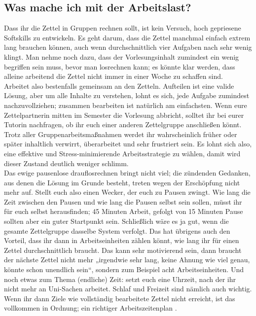 \subsection{Was mache ich mit der Arbeitslast?}
Dass ihr die Zettel in Gruppen rechnen sollt, ist kein Versuch, hoch gepriesene Softskills zu entwickeln. Es geht darum, dass die Zettel manchmal einfach extrem lang brauchen können, auch wenn durchschnittlich vier Aufgaben nach sehr wenig klingt. Man nehme noch dazu, dass der Vorlesungsinhalt zumindest ein wenig begriffen sein muss, bevor man losrechnen kann; es könnte klar werden, dass alleine arbeitend die Zettel nicht immer in einer Woche zu schaffen sind. \\
Arbeitet also bestenfalls gemeinsam an den Zetteln. Aufteilen ist eine valide Lösung, aber um alle Inhalte zu verstehen, lohnt es sich, jede Aufgabe zumindest nachzuvollziehen; zusammen bearbeiten ist natürlich am einfachsten.
Wenn eure Zettelpartnerin mitten im Semester die Vorlesung abbricht, solltet ihr bei eurer Tutorin nachfragen, ob ihr euch einer anderen Zettelgruppe anschließen könnt. \\
Trotz aller Gruppenarbeitsmaßnahmen werdet ihr wahrscheinlich früher oder später inhaltlich verwirrt, überarbeitet und sehr frustriert sein. Es lohnt sich also, eine effektive und Stress-minimierende Arbeitsstrategie zu wählen, damit wird dieser Zustand deutlich weniger schlimm. \\
Das ewige pausenlose drauflosrechnen bringt nicht viel; die zündenden Gedanken, aus denen die Lösung im Grunde besteht, treten wegen der Erschöpfung nicht mehr auf. Stellt euch also einen Wecker, der euch zu Pausen zwingt. Wie lang die Zeit zwischen den Pausen und wie lang die Pausen selbst sein sollen, müsst ihr für euch selbst herausfinden; 45 Minuten Arbeit, gefolgt von 15 Minuten Pause sollten aber ein guter Startpunkt sein. Schließlich wäre es ja gut, wenn die gesamte Zettelgruppe dasselbe System verfolgt. Das hat übrigens auch den Vorteil, dass ihr dann in Arbeitseinheiten zählen könnt, wie lang ihr für einen Zettel durchschnittlich braucht. Das kann sehr motivierend sein, dann braucht der nächste Zettel nicht mehr „irgendwie sehr lang, keine Ahnung wie viel genau, könnte schon unendlich sein“, sondern zum Beispiel acht Arbeitseinheiten.
Und noch etwas zum Thema (endliche) Zeit: setzt euch eine Uhrzeit, nach der ihr nicht mehr an Uni-Sachen arbeitet. Schlaf und Freizeit sind nämlich auch wichtig. Wenn ihr dann Ziele wie vollständig bearbeitete Zettel nicht erreicht, ist das vollkommen in Ordnung; ein richtiger Arbeitszeitenplan . \\
